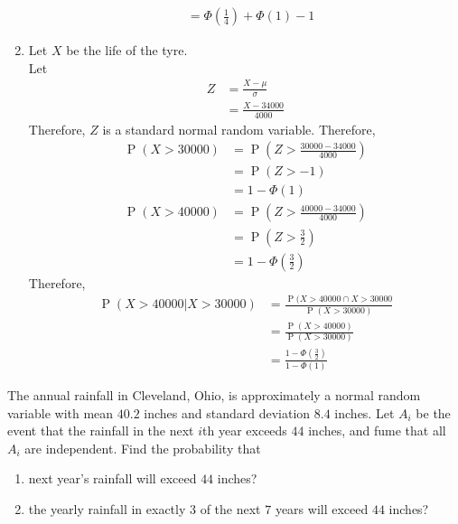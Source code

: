 \documentclass[fleqn, a4paper, 11pt, oneside]{amsart}
\theoremstyle{definition}
\theoremstyle{theorem}
\DeclareMathOperator{\prob}{\mathrm{P}}
\begin{document}
\begin{solution}
\begin{enumerate}[leftmargin=*]
\begin{align*}
				&= \Phi\left( \frac{1}{4} \right) + \Phi(1) - 1
			\end{align*}
		\item
			Let $X$ be the life of the tyre.\\
			Let
			\begin{align*}
				Z &= \frac{X - \mu}{\sigma}\\
				&= \frac{X - 34000}{4000}
			\end{align*}
			Therefore, $Z$ is a standard normal random variable.
			Therefore,
			\begin{align*}
				\prob(X > 30000) &= \prob\left( Z > \frac{30000 - 34000}{4000} \right)\\
				&= \prob(Z > -1)\\
				&= 1 - \Phi(1)\\
				\prob(X > 40000) &= \prob\left( Z > \frac{40000 - 34000}{4000} \right)\\
				&= \prob\left( Z > \frac{3}{2} \right)\\
				&= 1 - \Phi\left( \frac{3}{2} \right)
			\end{align*}
			Therefore,
			\begin{align*}
				\prob(X > 40000 | X > 30000) &= \frac{\prob(X > 40000 \cap X > 30000}{\prob(X > 30000)}\\
				&= \frac{\prob(X > 40000)}{\prob(X > 30000)}\\
				&= \frac{1 - \Phi\left( \frac{3}{2} \right)}{1 - \Phi(1)}
			\end{align*}
	\end{enumerate}
\end{solution}

\begin{question}
	The annual rainfall in Cleveland, Ohio, is approximately a normal random variable with mean $40.2$ inches and standard deviation $8.4$ inches.
	Let $A_i$ be the event that the rainfall in the next $i$th year exceeds $44$ inches, and fume that all $A_i$ are independent.
	Find the probability that
	\begin{enumerate}
		\item next year's rainfall will exceed $44$ inches?
		\item the yearly rainfall in exactly $3$ of the next $7$ years will exceed $44$ inches?
	\end{enumerate}
\end{question}
\end{document}

